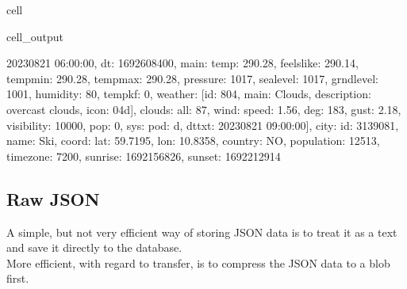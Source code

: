 \documentclass[letterpaper,10pt,english]{jupyterBook}
\begin{document}
\begin{sphinxuseclass}{cell}
\begin{sphinxVerbatimOutput}
\begin{sphinxuseclass}{cell_output}
\begin{sphinxVerbatim}[commandchars=\\\{\}]
\PYGZsq{}2023\PYGZhy{}08\PYGZhy{}21 06:00:00\PYGZsq{}\PYGZcb{}, \PYGZob{}\PYGZsq{}dt\PYGZsq{}: 1692608400, \PYGZsq{}main\PYGZsq{}: \PYGZob{}\PYGZsq{}temp\PYGZsq{}: 290.28, \PYGZsq{}feels\PYGZus{}like\PYGZsq{}: 290.14, \PYGZsq{}temp\PYGZus{}min\PYGZsq{}: 290.28, \PYGZsq{}temp\PYGZus{}max\PYGZsq{}: 290.28, \PYGZsq{}pressure\PYGZsq{}: 1017, \PYGZsq{}sea\PYGZus{}level\PYGZsq{}: 1017, \PYGZsq{}grnd\PYGZus{}level\PYGZsq{}: 1001, \PYGZsq{}humidity\PYGZsq{}: 80, \PYGZsq{}temp\PYGZus{}kf\PYGZsq{}: 0\PYGZcb{}, \PYGZsq{}weather\PYGZsq{}: [\PYGZob{}\PYGZsq{}id\PYGZsq{}: 804, \PYGZsq{}main\PYGZsq{}: \PYGZsq{}Clouds\PYGZsq{}, \PYGZsq{}description\PYGZsq{}: \PYGZsq{}overcast clouds\PYGZsq{}, \PYGZsq{}icon\PYGZsq{}: \PYGZsq{}04d\PYGZsq{}\PYGZcb{}], \PYGZsq{}clouds\PYGZsq{}: \PYGZob{}\PYGZsq{}all\PYGZsq{}: 87\PYGZcb{}, \PYGZsq{}wind\PYGZsq{}: \PYGZob{}\PYGZsq{}speed\PYGZsq{}: 1.56, \PYGZsq{}deg\PYGZsq{}: 183, \PYGZsq{}gust\PYGZsq{}: 2.18\PYGZcb{}, \PYGZsq{}visibility\PYGZsq{}: 10000, \PYGZsq{}pop\PYGZsq{}: 0, \PYGZsq{}sys\PYGZsq{}: \PYGZob{}\PYGZsq{}pod\PYGZsq{}: \PYGZsq{}d\PYGZsq{}\PYGZcb{}, \PYGZsq{}dt\PYGZus{}txt\PYGZsq{}: \PYGZsq{}2023\PYGZhy{}08\PYGZhy{}21 09:00:00\PYGZsq{}\PYGZcb{}], \PYGZsq{}city\PYGZsq{}: \PYGZob{}\PYGZsq{}id\PYGZsq{}: 3139081, \PYGZsq{}name\PYGZsq{}: \PYGZsq{}Ski\PYGZsq{}, \PYGZsq{}coord\PYGZsq{}: \PYGZob{}\PYGZsq{}lat\PYGZsq{}: 59.7195, \PYGZsq{}lon\PYGZsq{}: 10.8358\PYGZcb{}, \PYGZsq{}country\PYGZsq{}: \PYGZsq{}NO\PYGZsq{}, \PYGZsq{}population\PYGZsq{}: 12513, \PYGZsq{}timezone\PYGZsq{}: 7200, \PYGZsq{}sunrise\PYGZsq{}: 1692156826, \PYGZsq{}sunset\PYGZsq{}: 1692212914\PYGZcb{}\PYGZcb{}\PYGZdq{}
\end{sphinxVerbatim}

\end{sphinxuseclass}\end{sphinxVerbatimOutput}

\end{sphinxuseclass}

\subsection{Raw JSON}
\label{\detokenize{2_Data_sources/Databases/Cassandra:raw-json}}
\sphinxAtStartPar
A simple, but not very efficient way of storing JSON data is to treat it as a text and save it directly to the database.\\
More efficient, with regard to transfer, is to compress the JSON data to a blob first.
\end{document}
